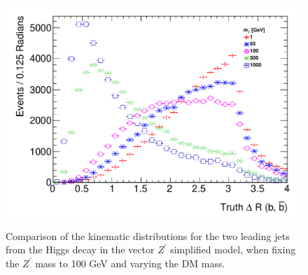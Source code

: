 \begin{figure}[hbpt!]
{		\includegraphics[width=0.47\linewidth]{figures/EW/monoH/zpzp100/truth_bb_deltar} %
	}
	\hfill
	\caption{Comparison of the kinematic distributions for the two leading jets from the Higgs decay in the vector $Z^\prime$ simplified model, 
		when fixing the $Z^\prime$ mass to 100 GeV and varying the DM mass. 
		\label{fig:VectorHbb_100}}
\end{figure}

